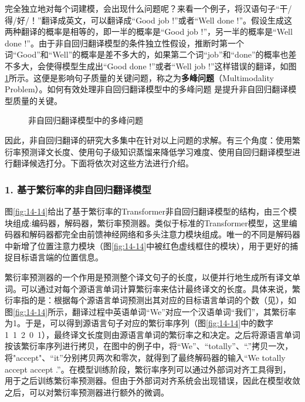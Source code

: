 \parinterval 完全独立地对每个词建模，会出现什么问题呢？来看一个例子，将汉语句子“干/得/好/！”翻译成英文，可以翻译成“Good job !”或者“Well done !”。假设生成这两种翻译的概率是相等的，即一半的概率是“Good job !”，另一半的概率是“Well done !”。由于非自回归翻译模型的条件独立性假设，推断时第一个词“Good”和“Well”的概率是差不多大的，如果第二个词“job”和“done”的概率也差不多大，会使得模型生成出“Good done !”或者“Well job !”这样错误的翻译，如图\ref{fig:14-13}所示。这便是影响句子质量的关键问题，称之为{\small\sffamily\bfseries{多峰问题}}（Multimodality Problem）。如何有效处理非自回归翻译模型中的多峰问题  是提升非自回归翻译模型质量的关键。

\begin{figure}[htp]
\centering
 
\caption{非自回归翻译模型中的多峰问题}
\label{fig:14-13}
\end{figure}

\parinterval 因此，非自回归翻译的研究大多集中在针对以上问题的求解。有三个角度：使用繁衍率预测译文长度、使用句子级知识蒸馏来降低学习难度、使用自回归翻译模型进行翻译候选打分。下面将依次对这些方法进行介绍。


\subsubsection{1. 基于繁衍率的非自回归翻译模型}

\parinterval 图\ref{fig:14-14}给出了基于繁衍率的Transformer非自回归翻译模型的结构，由三个模块组成:编码器，解码器，繁衍率预测器。类似于标准的Transformer模型，这里编码器和解码器都完全由前馈神经网络和多头注意力模块组成。唯一的不同是解码器中新增了位置注意力模块（图\ref{fig:14-14}中被红色虚线框住的模块），用于更好的捕捉目标语言端的位置信息。

\parinterval 繁衍率预测器的一个作用是预测整个译文句子的长度，以便并行地生成所有译文单词。可以通过对每个源语言单词计算繁衍率来估计最终译文的长度。具体来说，繁衍率指的是：根据每个源语言单词预测出其对应的目标语言单词的个数（见\chaptersix），如图\ref{fig:14-14}所示，翻译过程中英语单词“We”对应一个汉语单词“我们”，其繁衍率为1。于是，可以得到源语言句子对应的繁衍率序列（图\ref{fig:14-14}中的数字1\ 1\ 2\ 0\ 1），最终译文长度则由源语言单词的繁衍率之和决定。之后将源语言单词按该繁衍率序列进行拷贝，在图中的例子中，将“We”、“totally”、“.”拷贝一次，将"accept"、“it”分别拷贝两次和零次，就得到了最终解码器的输入“We totally accept accept .”。在模型训练阶段，繁衍率序列可以通过外部词对齐工具得到， 用于之后训练繁衍率预测器。但由于外部词对齐系统会出现错误，因此在模型收敛之后，可以对繁衍率预测器进行额外的微调。

